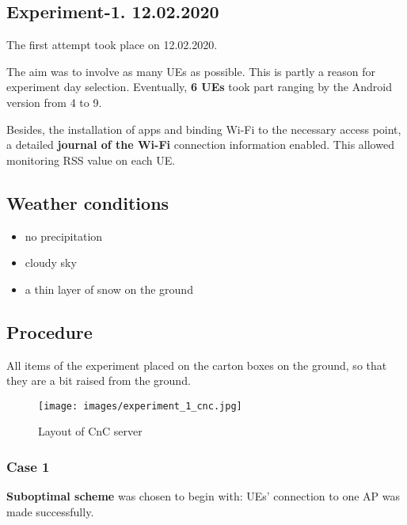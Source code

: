 \hypertarget{experiment-1.-12.02.2020}{%
\subsection{Experiment-1. 12.02.2020}\label{experiment-1.-12.02.2020}}

The first attempt took place on 12.02.2020.

The aim was to involve as many UEs as possible. This is partly a reason
for experiment day selection. Eventually, \textbf{6 UEs} took part
ranging by the Android version from 4 to 9.

Besides, the installation of apps and binding Wi-Fi to the necessary
access point, a detailed \textbf{journal of the Wi-Fi} connection
information enabled. This allowed monitoring RSS value on each UE.

\hypertarget{weather-conditions}{%
\subsection{Weather conditions}\label{weather-conditions}}

\begin{itemize}
\tightlist
\item
  no precipitation
\item
  cloudy sky
\item
  a thin layer of snow on the ground
\end{itemize}

\hypertarget{procedure}{%
\subsection{Procedure}\label{procedure}}

All items of the experiment placed on the carton boxes on the ground, so
that they are a bit raised from the ground.

\begin{figure}[H]
	\centering
	\texttt{[image: images/experiment\_1\_cnc.jpg]}
\caption{Layout of CnC server}
\end{figure}

\hypertarget{case-1}{%
\subsubsection{Case 1}\label{case-1}}

\textbf{Suboptimal scheme} was chosen to begin with: UEs' connection to
one AP was made successfully.

